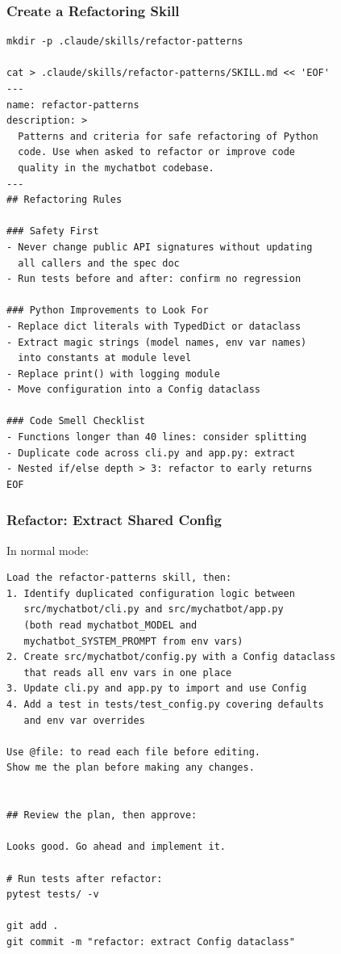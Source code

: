 \begin{frame}[fragile]\frametitle{Create a Refactoring Skill}
\begin{lstlisting}
mkdir -p .claude/skills/refactor-patterns

cat > .claude/skills/refactor-patterns/SKILL.md << 'EOF'
---
name: refactor-patterns
description: >
  Patterns and criteria for safe refactoring of Python
  code. Use when asked to refactor or improve code
  quality in the mychatbot codebase.
---
## Refactoring Rules

### Safety First
- Never change public API signatures without updating
  all callers and the spec doc
- Run tests before and after: confirm no regression

### Python Improvements to Look For
- Replace dict literals with TypedDict or dataclass
- Extract magic strings (model names, env var names)
  into constants at module level
- Replace print() with logging module
- Move configuration into a Config dataclass

### Code Smell Checklist
- Functions longer than 40 lines: consider splitting
- Duplicate code across cli.py and app.py: extract
- Nested if/else depth > 3: refactor to early returns
EOF
\end{lstlisting}
\end{frame}


\begin{frame}[fragile]\frametitle{Refactor: Extract Shared Config}
In normal mode:

\begin{lstlisting}
Load the refactor-patterns skill, then:
1. Identify duplicated configuration logic between
   src/mychatbot/cli.py and src/mychatbot/app.py
   (both read mychatbot_MODEL and
   mychatbot_SYSTEM_PROMPT from env vars)
2. Create src/mychatbot/config.py with a Config dataclass
   that reads all env vars in one place
3. Update cli.py and app.py to import and use Config
4. Add a test in tests/test_config.py covering defaults
   and env var overrides

Use @file: to read each file before editing.
Show me the plan before making any changes.


## Review the plan, then approve:

Looks good. Go ahead and implement it.

# Run tests after refactor:
pytest tests/ -v

git add .
git commit -m "refactor: extract Config dataclass"
\end{lstlisting}
\end{frame}


